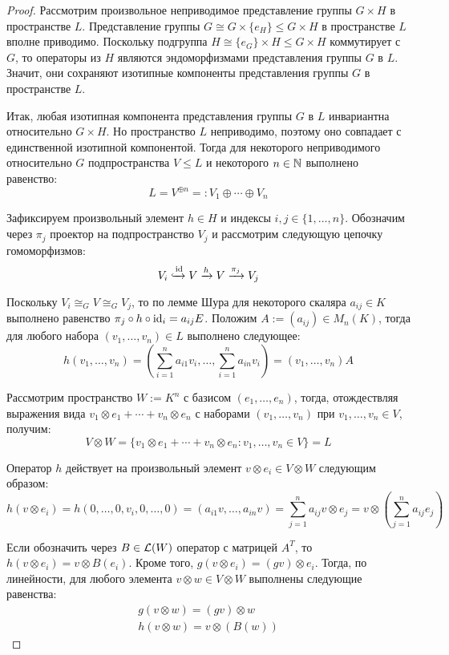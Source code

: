 \begin{proof}
	Рассмотрим произвольное неприводимое представление группы $G \times H$ в пространстве $L$. Представление группы $G \cong G \times \{e_H\} \le G \times H$ в пространстве $L$ вполне приводимо. Поскольку подгруппа $H \cong \{e_G\} \times H \le G \times H$ коммутирует с $G$, то операторы из $H$ являются эндоморфизмами представления группы $G$ в $L$. Значит, они сохраняют изотипные компоненты представления группы $G$ в пространстве $L$.
	
	Итак, любая изотипная компонента представления группы $G$ в $L$ инвариантна относительно $G \times H$. Но пространство $L$ неприводимо, поэтому оно совпадает с единственной изотипной компонентой. Тогда для некоторого неприводимого относительно $G$ подпространства $V \le L$ и некоторого $n \in \mathbb{N}$ выполнено равенство:
	\[L = V^{\oplus n} =: V_1 \oplus \dotsb \oplus V_n\]
	
	Зафиксируем произвольный элемент $h \in H$ и индексы $i, j \in \{1, \dotsc, n\}$. Обозначим через $\pi_j$ проектор на подпространство $V_j$ и рассмотрим следующую цепочку гомоморфизмов:
	\[V_i \xhookrightarrow[]{\mathrm{id}} V \xrightarrow{h} V \xrightarrow{\pi_j} V_j\]
	
	Поскольку $V_i \cong_G V \cong_G V_j$, то по лемме Шура для некоторого скаляра $a_{ij} \in K$ выполнено равенство $\pi_j \circ h \circ \mathrm{id}_i = a_{ij}E$. Положим $A := (a_{ij}) \in M_n(K)$, тогда для любого набора $(v_1, \dotsc, v_n) \in L$ выполнено следующее:
	\[h(v_1, \dotsc, v_n) = \left(\sum_{i = 1}^na_{i1}v_i, \dotsc, \sum_{i = 1}^na_{in}v_i\right) = (v_1, \dotsc, v_n)A\]
	
	Рассмотрим пространство $W := K^n$ с базисом $(e_1, \dotsc, e_n)$, тогда, отождествляя выражения вида $v_1 \otimes e_1 + \dotsb + v_n \otimes e_n$ с наборами $(v_1, \dotsc, v_n)$ при $v_1, \dotsc, v_n \in V$, получим:
	\[V \otimes W = \{v_1 \otimes e_1 + \dotsb + v_n \otimes e_n : v_1, \dotsc, v_n \in V\} = L\]
	
	Оператор $h$ действует на произвольный элемент $v \otimes e_i \in V \otimes W$ следующим образом:
	\[h(v \otimes e_i) = h(0, \dotsc, 0, v_i, 0, \dotsc, 0) = \left(a_{i1}v, \dotsc, a_{in}v\right) = \sum_{j=1}^na_{ij}v\otimes e_{j} = v \otimes \left(\sum_{j=1}^na_{ij} e_{j}\right)\]
	
	Если обозначить через $B \in \mathcal L(W)$ оператор с матрицей $A^T$, то $h(v \otimes e_i) = v \otimes B(e_i)$. Кроме того, $g(v \otimes e_i) = (gv) \otimes e_i$. Тогда, по линейности, для любого элемента $v \otimes w \in V \otimes W$ выполнены следующие равенства:
	\begin{gather*}
		g(v \otimes w) = (gv) \otimes w\\
		h(v \otimes w) = v \otimes (B(w))
	\end{gather*}


\end{proof}

